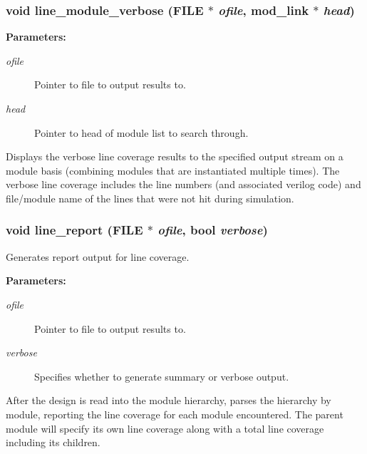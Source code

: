 \subsubsection{\setlength{\rightskip}{0pt plus 5cm}void line\_\-module\_\-verbose (FILE $\ast$ {\em ofile}, {\bf mod\_\-link} $\ast$ {\em head})}\label{line_8c_a10}


\begin{Desc}
\item[{\bf Parameters: }]\par
\begin{description}
\item[
{\em ofile}]Pointer to file to output results to. \item[
{\em head}]Pointer to head of module list to search through.

\end{description}
\end{Desc}
Displays the verbose line coverage results to the specified output stream on a module basis (combining modules that are instantiated multiple times). The verbose line coverage includes the line numbers (and associated verilog code) and file/module name of the lines that were not hit during simulation. 
\subsubsection{\setlength{\rightskip}{0pt plus 5cm}void line\_\-report (FILE $\ast$ {\em ofile}, {\bf bool} {\em verbose})}\label{line_8c_a11}


Generates report output for line coverage.

\begin{Desc}
\item[{\bf Parameters: }]\par
\begin{description}
\item[
{\em ofile}]Pointer to file to output results to. \item[
{\em verbose}]Specifies whether to generate summary or verbose output.

\end{description}
\end{Desc}
After the design is read into the module hierarchy, parses the hierarchy by module, reporting the line coverage for each module encountered. The parent module will specify its own line coverage along with a total line coverage including its  children. 

